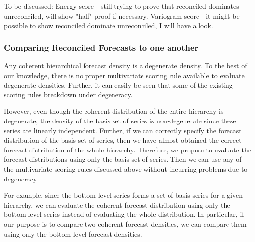 \documentclass[a4paper, 11pt]{article}
\theoremstyle{theo}
\theoremstyle{definition}
\begin{document}
To be discussed: Energy score - still trying to prove that reconciled dominates unreconciled, will show "half" proof if necessary. Variogram score - it might be possible to show reconciled dominate unreconciled, I will have a look.


\subsubsection{Comparing Reconciled Forecasts to one another}

Any coherent hierarchical forecast density is a degenerate density. To the best of our knowledge, there is no proper multivariate scoring rule available to evaluate degenerate densities. Further, it can easily be seen that some of the existing scoring rules breakdown under degeneracy. 



However, even though the coherent distribution of the entire hierarchy is degenerate, the density of the basis set of series is non-degenerate since these series are linearly independent. Further, if we can correctly specify the forecast distribution of the basis set of series, then we have almost obtained the correct forecast distribution of the whole hierarchy. Therefore, we propose to evaluate the forecast distributions using only the basis set of series. Then we can use any of the multivariate scoring rules discussed above without incurring problems due to degeneracy.

For example, since the bottom-level series forms a set of basis series for a given hierarchy, we can evaluate the coherent forecast distribution using only the bottom-level series instead of evaluating the whole distribution. In particular, if our purpose is to compare two coherent forecast densities, we can compare them using only the bottom-level forecast densities.
\end{document}
